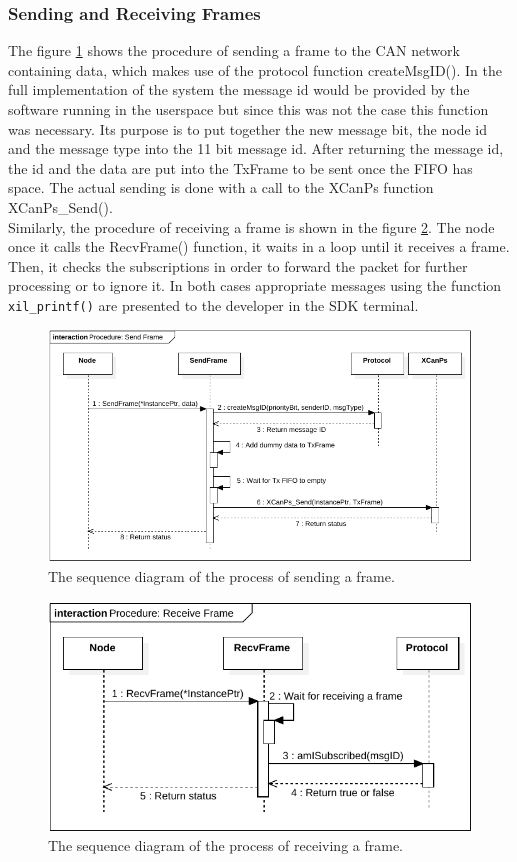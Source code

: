 \subsubsection*{Sending and Receiving Frames}
The figure \ref{fig:SeqDiagram_SendFrame} shows the procedure of sending a frame to the CAN network containing data, which makes use of the protocol function createMsgID().
In the full implementation of the system the message id would be provided by the software running in the userspace but since this was not the case this function was necessary.
Its purpose is to put together the new message bit, the node id and the message type into the 11 bit message id.
After returning the message id, the id and the data are put into the TxFrame to be sent once the FIFO has space.
The actual sending is done with a call to the XCanPs function XCanPs\_Send().
\\
Similarly, the procedure of receiving a frame is shown in the figure \ref{fig:SeqDiagram_RecvFrame}.
The node once it calls the RecvFrame() function, it waits in a loop until it receives a frame.
Then, it checks the subscriptions in order to forward the packet for further processing or to ignore it.
In both cases appropriate messages using the function \texttt{xil\_printf()} are presented to the developer in the SDK terminal.

\begin{figure}[h!]
	\centering
	\includegraphics[width = 1\linewidth]{graphics/SeqDiagram_SendFrame.pdf}
	\caption{The sequence diagram of the process of sending a frame.}
	\label{fig:SeqDiagram_SendFrame}
\end{figure}

\begin{figure}[h!]
	\centering
	\includegraphics[width = 1\linewidth]{graphics/SeqDiagram_RecvFrame.pdf}
	\caption{The sequence diagram of the process of receiving a frame.}
	\label{fig:SeqDiagram_RecvFrame}
\end{figure}